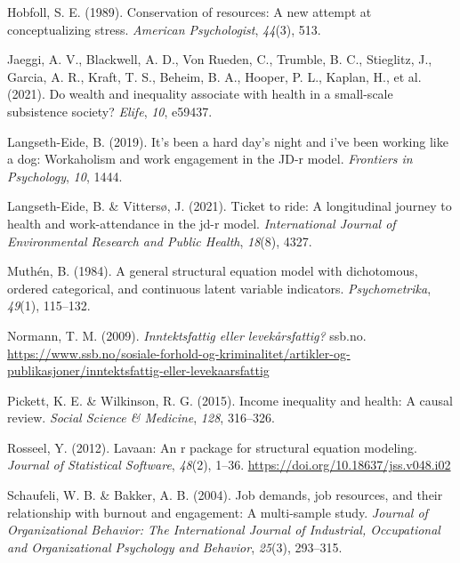 \documentclass[
  12pt,
  a4paper,
  DIV=11,
  numbers=noendperiod]{scrartcl}
\newlength{\cslhangindent}
\newenvironment{CSLReferences}[2] %
 {\begin{list}{}{%
  \setlength{\itemindent}{0pt}
  \setlength{\leftmargin}{0pt}
  \setlength{\parsep}{0pt}
  \ifodd #1
   \setlength{\leftmargin}{\cslhangindent}
   \setlength{\itemindent}{-1\cslhangindent}
  \fi
  \setlength{\itemsep}{#2\baselineskip}}}
 {\end{list}}
\begin{document}
\begin{CSLReferences}{1}{0}
Hobfoll, S. E. (1989). Conservation of resources: A new attempt at
conceptualizing stress. \emph{American Psychologist}, \emph{44}(3), 513.

Jaeggi, A. V., Blackwell, A. D., Von Rueden, C., Trumble, B. C.,
Stieglitz, J., Garcia, A. R., Kraft, T. S., Beheim, B. A., Hooper, P.
L., Kaplan, H., et al. (2021). Do wealth and inequality associate with
health in a small-scale subsistence society? \emph{Elife}, \emph{10},
e59437.

Langseth-Eide, B. (2019). It's been a hard day's night and i've been
working like a dog: Workaholism and work engagement in the JD-r model.
\emph{Frontiers in Psychology}, \emph{10}, 1444.

Langseth-Eide, B. \& Vittersø, J. (2021). Ticket to ride: A longitudinal
journey to health and work-attendance in the jd-r model.
\emph{International Journal of Environmental Research and Public
Health}, \emph{18}(8), 4327.

Muthén, B. (1984). A general structural equation model with dichotomous,
ordered categorical, and continuous latent variable indicators.
\emph{Psychometrika}, \emph{49}(1), 115--132.

Normann, T. M. (2009). \emph{Inntektsfattig eller levekårsfattig?}
ssb.no.
\url{https://www.ssb.no/sosiale-forhold-og-kriminalitet/artikler-og-publikasjoner/inntektsfattig-eller-levekaarsfattig}

Pickett, K. E. \& Wilkinson, R. G. (2015). Income inequality and health:
A causal review. \emph{Social Science \& Medicine}, \emph{128},
316--326.

Rosseel, Y. (2012). Lavaan: An r package for structural equation
modeling. \emph{Journal of Statistical Software}, \emph{48}(2), 1--36.
\url{https://doi.org/10.18637/jss.v048.i02}

Schaufeli, W. B. \& Bakker, A. B. (2004). Job demands, job resources,
and their relationship with burnout and engagement: A multi-sample
study. \emph{Journal of Organizational Behavior: The International
Journal of Industrial, Occupational and Organizational Psychology and
Behavior}, \emph{25}(3), 293--315.


\end{CSLReferences}
\end{document}
